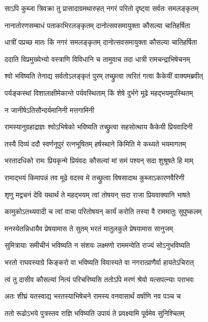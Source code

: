\twolineshloka
{साऽपि कुब्जा त्रिवक्रा तु प्रासादाग्रमथारुहत्}
{नगरं परितो दृष्ट्वा सर्वतः समलङ्कृतम्} %

\twolineshloka
{नानातोरणसम्बाधं पताकाभिरलङ्कृतम्}
{दानोत्सवसमायुक्ता कौसल्या चातिहर्षिता} %

\twolineshloka
{धात्रीं पप्रच्छ मातः किं नगरं समलङ्कृतम्}
{दानोत्सवसमायुक्ता कौसल्या चातिहर्षिता} %

\twolineshloka
{ददाति विप्रमुख्येभ्यो वस्त्राणि विविधानि च}
{तामुवाच तदा धात्री रामचन्द्राभिषेचनम्} %

\twolineshloka
{श्वो भविष्यति तेनाद्य सर्वतोऽलङ्कृतं पुरम्}
{तच्छ्रुत्वा त्वरितं गत्वा कैकेयीं वाक्यमब्रवीत्} %

\twolineshloka
{पर्यङ्कस्थां विशालाक्षीमेकान्ते पर्यवस्थिताम्}
{किं शेषे दुर्भगे मूढे महद्भयमुपस्थितम्} %

\onelineshloka
{न जानीषेऽतिसौन्दर्यमानिनी मत्तगामिनी} %

\twolineshloka
{रामस्यानुग्रहाद्राज्ञः श्वोऽभिषेको भविष्यति}
{तच्छ्रुत्वा सहसोत्थाय कैकेयी प्रियवादिनी} %

\twolineshloka
{तस्यै दिव्यं ददौ स्वर्णनूपुरं रत्नभूषितम्}
{हर्षस्थाने किमिति मे कथ्यते भयमागतम्} %

\twolineshloka
{भरतादधिको रामः प्रियकृन्मे प्रियंवदः}
{कौसल्यां मां समं पश्यन् सदा शुश्रूषते हि माम्} %

\twolineshloka
{रामाद्भयं किमापन्नं तव मूढे वदस्व मे}
{तच्छ्रुत्वा विषसादाथ कुब्जाऽकारणवैरिणी} %

\twolineshloka
{शृणु मद्वचनं देवि यथार्थं ते महद्भयम्}
{त्वां तोषयन् सदा राजा प्रियवाक्यानि भाषते} %

\twolineshloka
{कामुकोऽतथ्यवादी च त्वां वाचा परितोषयन्}
{कार्यं करोति तस्या वै राममातुः सुपुष्कलम्} %

\twolineshloka
{मनस्येतन्निधायैव प्रेषयामास ते सुतम्}
{भरतं मातुलकुले प्रेषयामास सानुजम्} %

\twolineshloka
{सुमित्रायाः समीचीनं भविष्यति न संशयः}
{लक्ष्मणो राममन्वेति राज्यं सोऽनुभविष्यति} %

\twolineshloka
{भरतो राघवस्याग्रे किङ्करो वा भविष्यति}
{विवास्यते वा नगरात्प्राणैर्वा हायतेऽचिरात्} %

\twolineshloka
{त्वं तु दासीव कौसल्यां नित्यं परिचरिष्यसि}
{ततोऽपि मरणं श्रेयो यत्सपत्न्याः पराभवः} %

\twolineshloka
{अतः शीघ्रं यतस्वाद्य भरतस्याभिषेचने}
{रामस्य वनवासार्थं वर्षाणि नव पञ्च च} %

\twolineshloka
{ततो रूढोऽभये पुत्रस्तव राज्ञि भविष्यति}
{उपायं ते प्रवक्ष्यामि पूर्वमेव सुनिश्चितम्} %

